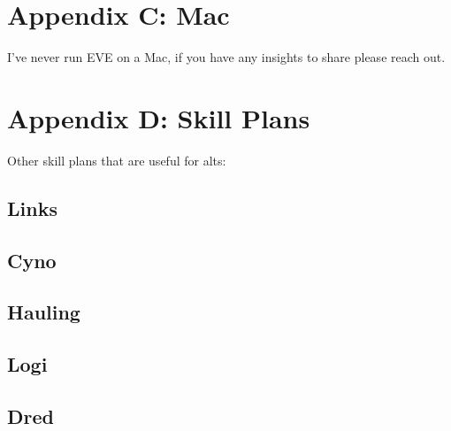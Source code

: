\documentclass{article}
\begin{document}

\section*{Appendix C: Mac}
I've never run EVE on a Mac, if you have any insights to share please reach out.

\section*{Appendix D: Skill Plans}
Other skill plans that are useful for alts:

\subsection*{Links}
\subsection*{Cyno}
\subsection*{Hauling}
\subsection*{Logi}
\subsection*{Dred}
\end{document}
